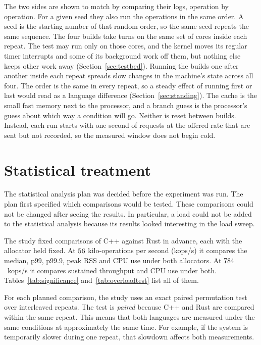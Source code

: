 \documentclass[english,oneside,a4paper,censored,csm,software-track-2020]{HYthesisML}
\begin{document}
The two sides are shown to match by comparing their logs, operation by
operation. For a given seed they also run the operations in the same order.
A seed is the starting number of that random order, so the same seed repeats
the same sequence. The four builds take turns on the same set of cores
inside each repeat. The test may run only on those cores, and the kernel
moves its regular timer interrupts and some of its background work off them, but
nothing else keeps other work away (Section~\ref{sec:testbed}). Running the
builds one after another inside each repeat spreads slow changes in the
machine's state across all four. The order is the same in every repeat, so a
steady effect of running first or last would read as a language difference
(Section~\ref{sec:standing}). The cache is the small fast memory next to
the processor, and a branch guess is the processor's guess about which way a
condition will go. Neither is reset between builds. Instead, each run starts
with one second of requests at the offered rate that are sent but not
recorded, so the measured window does not begin cold.

\section{Statistical treatment}\label{sec:statsbrief}
The statistical analysis plan was decided before the experiment was run. The plan first
specified which comparisons would be tested. These comparisons could not be changed
after seeing the results. In particular, a load could not be added to the statistical
analysis because its results looked interesting in the load sweep.

The study fixed \NTests{} comparisons of C++ against Rust in advance, each with the
allocator held fixed. At $56$ kilo-operations per second (kops/s) it compares the median, p99,
p99.9, peak RSS and CPU use under both allocators. At $784$~kops/s it compares
sustained throughput and CPU use under both. Tables~\ref{tab:significance}
and~\ref{tab:overloadtest} list all of them.

For each planned comparison, the study uses an exact paired permutation test over \NRepeats{}
interleaved repeats. The test is \emph{paired} because C++ and Rust are compared
within the same repeat. This means that both languages are measured under the same
conditions at approximately the same time. For example, if the system is temporarily
slower during one repeat, that slowdown affects both measurements.
\end{document}
